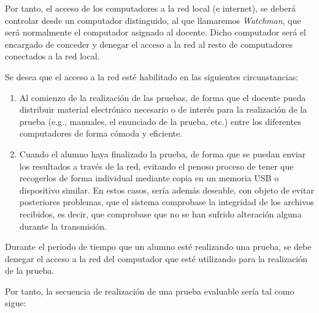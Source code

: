 
Por tanto, el acceso de los computadores a la red local (e internet), se deberá controlar desde un computador distinguido, al que llamaremos \emph{Watchman},
que será normalmente el computador asignado al docente. Dicho computador será el encargado de conceder y denegar el acceso a la red al resto de computadores conectados a la red local.
\newline

Se desea que el acceso a la red esté habilitado en las siguientes circunstancias:
\begin{enumerate}
	\item Al comienzo de la realización de las pruebas, de forma que el docente pueda distribuir material electrónico necesario o de interés para la realización de la prueba (e.g., manuales, el enunciado de la prueba, etc.) entre los diferentes computadores de forma cómoda y eficiente.
	\item Cuando el alumno haya finalizado la prueba, de forma que se puedan enviar los resultados a través de la red, evitando el penoso proceso de tener que recogerlos de forma individual mediante copia en un memoria USB o dispositivo similar. En estos casos, sería además deseable, con objeto de evitar posteriores problemas, que el sistema comprobase la integridad de los archivos recibidos, es decir, que comprobase que no se han sufrido alteración alguna durante la transmisión.
\end{enumerate}

Durante el periodo de tiempo que un alumno esté realizando una prueba, se debe denegar el acceso a la red del computador que esté utilizando para la realización de la prueba.
\newline


Por tanto, la secuencia de realización de una prueba evaluable sería tal como sigue:

